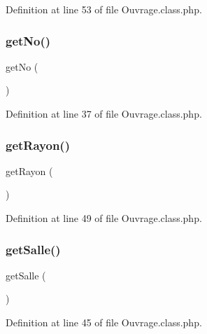 Definition at line 53 of file Ouvrage.\+class.\+php.

\mbox{\label{class_ouvrage_a564e570c404f71eceea25e7d28cdad04}} 
\subsubsection{\texorpdfstring{get\+No()}{getNo()}}
{\footnotesize\ttfamily get\+No (\begin{DoxyParamCaption}{ }\end{DoxyParamCaption})}



Definition at line 37 of file Ouvrage.\+class.\+php.

\mbox{\label{class_ouvrage_ac6a6bc548f052164c582117d296d8467}} 
\subsubsection{\texorpdfstring{get\+Rayon()}{getRayon()}}
{\footnotesize\ttfamily get\+Rayon (\begin{DoxyParamCaption}{ }\end{DoxyParamCaption})}



Definition at line 49 of file Ouvrage.\+class.\+php.

\mbox{\label{class_ouvrage_aca023bb97e2b632a2dbb2a6b2307cb70}} 
\subsubsection{\texorpdfstring{get\+Salle()}{getSalle()}}
{\footnotesize\ttfamily get\+Salle (\begin{DoxyParamCaption}{ }\end{DoxyParamCaption})}



Definition at line 45 of file Ouvrage.\+class.\+php.

\mbox{\label{class_ouvrage_a11c380e71778af9871c5bd84b2f50eae}} 
